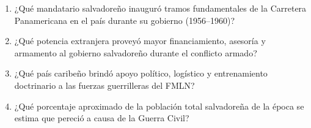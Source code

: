 \documentclass[10pt,a4paper]{article}
\begin{document}
\begin{enumerate}[label=\textbf{\arabic*.}]
\begin{enumerate}[label=\textbf{\Alph*)}]
\end{enumerate}
\vspace{0.15cm}
\item ¿Qué mandatario salvadoreño inauguró tramos fundamentales de la Carretera Panamericana en el país durante su gobierno (1956–1960)?
\begin{enumerate}[label=\textbf{\Alph*)}]
\end{enumerate}
\vspace{0.15cm}
\item ¿Qué potencia extranjera proveyó mayor financiamiento, asesoría y armamento al gobierno salvadoreño durante el conflicto armado?
\begin{enumerate}[label=\textbf{\Alph*)}]
\end{enumerate}
\vspace{0.15cm}
\item ¿Qué país caribeño brindó apoyo político, logístico y entrenamiento doctrinario a las fuerzas guerrilleras del FMLN?
\begin{enumerate}[label=\textbf{\Alph*)}]
\end{enumerate}
\vspace{0.15cm}
\item ¿Qué porcentaje aproximado de la población total salvadoreña de la época se estima que pereció a causa de la Guerra Civil?

\end{enumerate}
\end{document}

